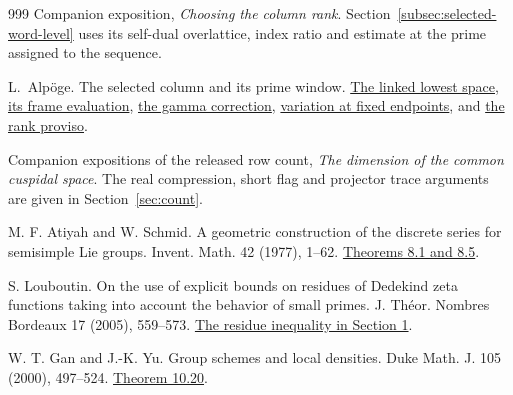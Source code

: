 \documentclass[11pt]{article}
\theoremstyle{definition}
\theoremstyle{plain}
\begin{document}
\begin{thebibliography}{999}
 Companion exposition,
\emph{Choosing the column rank}. Section~\ref{subsec:selected-word-level}
uses its self-dual overlattice, index ratio and estimate at the prime assigned to the sequence.

 L.~Alp\"oge. The selected column and its prime window.
\href{https://github.com/TomasOrtega/RH/blob/a6ac91a412dcbaab31801355ec5707024a71bf65/extracted/lean/src/Development/AutomorphicArithmetic/ThetaCorrespondence/ThetaPairLifts/ThirdPlaceSeries/ClosedRankTiesFC2S.lean}{The linked lowest space},
\href{https://github.com/TomasOrtega/RH/blob/a6ac91a412dcbaab31801355ec5707024a71bf65/extracted/lean/src/Formalism/SharpRestriction/GlobalSchurBounds/GlobalRankLatticeProofs/UnitTraceSumBounds/RankConditionsOfLayerTwo.lean}{its frame evaluation},
\href{https://github.com/TomasOrtega/RH/blob/a6ac91a412dcbaab31801355ec5707024a71bf65/extracted/lean/src/Formalism/SharpRestriction/GlobalSchurBounds/GlobalRankLatticeProofs/UnitTraceSumBounds/FamilyLogGammaSmallHolds.lean}{the gamma correction},
\href{https://github.com/TomasOrtega/RH/blob/a6ac91a412dcbaab31801355ec5707024a71bf65/extracted/lean/src/Formalism/SharpRestriction/GlobalSchurBounds/GlobalRankLatticeProofs/LogVandermondeVariationGeneric.lean}{variation at fixed endpoints},
and \href{https://github.com/TomasOrtega/RH/blob/a6ac91a412dcbaab31801355ec5707024a71bf65/extracted/lean/src/Formalism/SharpRestriction/GlobalSchurBounds/TheoremThreeFamilyOfFormalDegreeInput.lean}{the rank proviso}.

 Companion expositions of the released row count, \emph{The dimension of the common cuspidal space}.
The real compression, short flag and projector trace arguments are given in Section~\ref{sec:count}.

 M. F. Atiyah and W. Schmid.
A geometric construction of the discrete series for semisimple Lie groups.
Invent. Math. 42 (1977), 1--62.
\href{https://doi.org/10.1007/BF01389783}{Theorems 8.1 and 8.5}.

 S. Louboutin.
On the use of explicit bounds on residues of Dedekind zeta functions taking into account the behavior of small primes.
J. Th\'eor. Nombres Bordeaux 17 (2005), 559--573.
\href{https://jtnb.centre-mersenne.org/item/10.5802/jtnb.508.pdf}{The residue inequality in Section 1}.

 W. T. Gan and J.-K. Yu.
Group schemes and local densities. Duke Math. J. 105 (2000), 497--524.
\href{https://doi.org/10.1215/S0012-7094-00-10535-2}{Theorem 10.20}.


\end{thebibliography}
\end{document}
